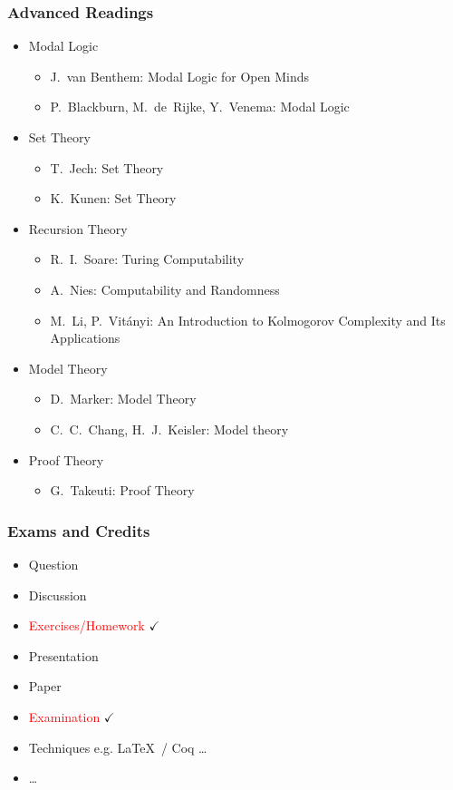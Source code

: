 \documentclass[UTF8,11pt,colorlinks,compress,openany]{beamer}%
\begin{document}
\begin{frame}\frametitle{Advanced Readings}
\begin{itemize}
	\item Modal Logic
		\begin{itemize}
			\item J.~van Benthem: Modal Logic for Open Minds
			\item P.~Blackburn, M.~de~Rijke, Y.~Venema: Modal Logic
		\end{itemize}
	\item Set Theory
		\begin{itemize}
			\item T.~Jech: Set Theory
			\item K.~Kunen: Set Theory
		\end{itemize}
	\item Recursion Theory
		\begin{itemize}
			\item R.~I.~Soare: Turing Computability
			\item A.~Nies: Computability and Randomness
			\item M.~Li, P.~Vit\'anyi: An Introduction to Kolmogorov Complexity and Its Applications
		\end{itemize}
	\item Model Theory
		\begin{itemize}
			\item D.~Marker: Model Theory
			\item C.~C.~Chang, H.~J.~Keisler: Model theory
		\end{itemize}
	\item Proof Theory
		\begin{itemize}
			\item G.~Takeuti: Proof Theory
		\end{itemize}
\end{itemize}
\end{frame}

\begin{frame}\frametitle{Exams and Credits}
	\begin{itemize}
		\item Question
		\item Discussion
		\item \textcolor{red}{Exercises/Homework} $\checkmark$
		\item Presentation
		\item Paper
		\item \textcolor{red}{Examination} $\checkmark$
		\item Techniques e.g. \LaTeX\, / Coq \dots
		\item \dots
	\end{itemize}
\end{frame}
\end{document}
